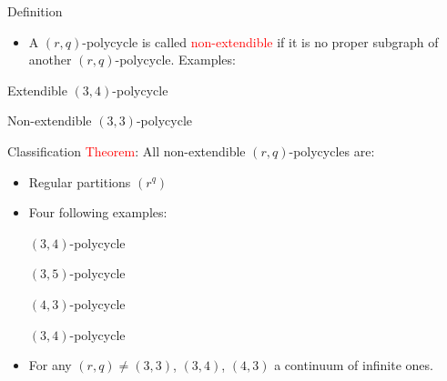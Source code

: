 \documentclass[%
pdf,
colorBG,
slideColor,
]{prosper}
\begin{document}
\begin{slide}{Definition}
\begin{itemize}
\item A $(r,q)$-polycycle is called \textcolor{red}{non-extendible} if it is no proper subgraph of another $(r,q)$-polycycle. Examples:
\end{itemize}
\begin{center}
\par
\begin{flushleft}
Extendible $(3,4)$-polycycle
\end{flushleft}
\par
Non-extendible $(3,3)$-polycycle
\end{center}




\end{slide}


\begin{slide}{Classification}
\textcolor{red}{Theorem}: All non-extendible $(r,q)$-polycycles are:
\begin{itemize}
\item Regular partitions $(r^q)$
\item Four following examples:
\begin{center}
\begin{minipage}{5.3cm}
\centering
{}\par
$(3, 4)$-polycycle
\end{minipage}
\begin{minipage}{5.3cm}
\centering
{}\par
$(3, 5)$-polycycle
\end{minipage}
\begin{minipage}{5.3cm}
\centering
{}\par
$(4, 3)$-polycycle
\end{minipage}
\begin{minipage}{5.3cm}
\centering
{}\par
$(3, 4)$-polycycle
\end{minipage}
\end{center}
\item For any $(r,q)\not= (3,3)$, $(3,4)$, $(4,3)$ a continuum of infinite ones.
\end{itemize}
\end{slide}
\end{document}
